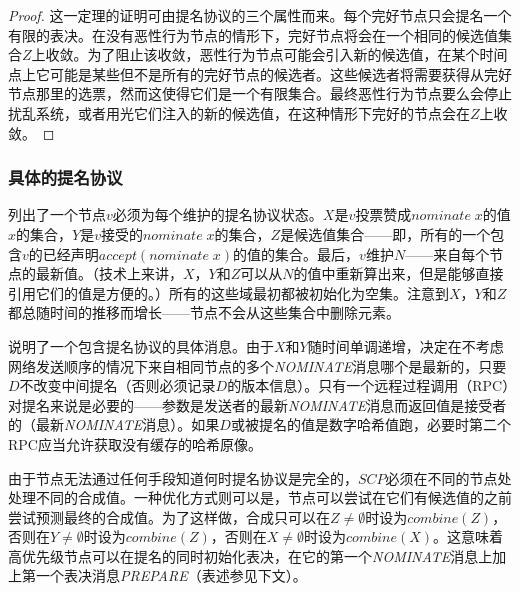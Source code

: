 \begin{proof}
	这一定理的证明可由提名协议的三个属性而来。每个完好节点只会提名一个有限的表决。在没有恶性行为节点的情形下，完好节点将会在一个相同的候选值集合$Z$上收敛。为了阻止该收敛，恶性行为节点可能会引入新的候选值，在某个时间点上它可能是某些但不是所有的完好节点的候选者。这些候选者将需要获得从完好节点那里的选票，然而这使得它们是一个有限集合。最终恶性行为节点要么会停止扰乱系统，或者用光它们注入的新的候选值，在这种情形下完好的节点会在$Z$上收敛。
\end{proof}

\subsubsection{具体的提名协议}

列出了一个节点$v$必须为每个{\slot}维护的提名协议状态。$X$是$v$投票赞成$nominate\;x$的值$x$的集合，$Y$是$v$接受的$nominate\;x$的集合，$Z$是候选值集合——即，所有的一个包含$v$的{\quorum}已经声明$accept(nominate\;x)$的值的集合。最后，$v$维护$N$——来自每个节点的最新值。（技术上来讲，$X$，$Y$和$Z$可以从$N$的值中重新算出来，但是能够直接引用它们的值是方便的。）所有的这些域最初都被初始化为空集。注意到$X$，$Y$和$Z$都总随时间的推移而增长——节点不会从这些集合中删除元素。

说明了一个包含提名协议的具体消息。由于$X$和$Y$随时间单调递增，决定在不考虑网络发送顺序的情况下来自相同节点的多个\textsl{NOMINATE}消息哪个是最新的，只要$D$不改变中间提名（否则必须记录$D$的版本信息）。只有一个远程过程调用（RPC）对提名来说是必要的——参数是发送者的最新\textsl{NOMINATE}消息而返回值是接受者的（最新\textsl{NOMINATE}消息）。如果$D$或被提名的值是数字哈希值跑，必要时第二个RPC应当允许获取没有缓存的哈希原像。

由于节点无法通过任何手段知道何时提名协议是完全的，$SCP$必须在不同的节点处处理不同的合成值。一种优化方式则可以是，节点可以尝试在它们有候选值的之前尝试预测最终的合成值。为了这样做，合成只可以在$Z\neq \emptyset$时设为$combine(Z)$，否则在$Y\neq \emptyset$时设为$combine(Z)$，否则在$X\neq \emptyset$时设为$combine(X)$。这意味着高优先级节点可以在提名的同时初始化表决，在它的第一个\textsl{NOMINATE}消息上加上第一个表决消息\textsl{PREPARE}（表述参见下文）。